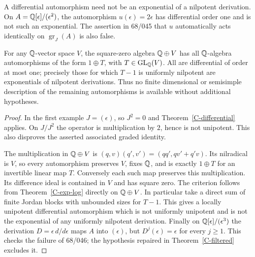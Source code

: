 \begin{proposition}\label{C-other-autos}
A differential automorphism need not be an exponential of a nilpotent
derivation. On $A={\mathbb{Q}}[\epsilon]/(\epsilon^2)$, the automorphism
$u(\epsilon)=2\epsilon$ has differential order one and is not such an
exponential. The assertion in 68/045 that $u$ automatically acts identically
on $\operatorname{gr}_J(A)$ is also false.

For any ${\mathbb{Q}}$-vector space $V$, the square-zero algebra ${\mathbb{Q}}\oplus V$ has
all ${\mathbb{Q}}$-algebra automorphisms of the form $1\oplus T$, with
$T\in\operatorname{GL}_{{\mathbb{Q}}}(V)$. All are differential of order at most one;
precisely those for which $T-1$ is uniformly nilpotent are exponentials of
nilpotent derivations. Thus no finite dimensional or semisimple description
of the remaining automorphisms is available without additional hypotheses.
\end{proposition}
\begin{proof}
In the first example $J=(\epsilon)$, so $J^2=0$ and
Theorem~\ref{C-differential} applies. On $J/J^2$ the operator is
multiplication by $2$, hence is not unipotent. This also disproves the
asserted associated graded identity.

The multiplication in ${\mathbb{Q}}\oplus V$ is
$(q,v)(q',v')=(qq',qv'+q'v)$. Its nilradical is $V$, so every automorphism
preserves $V$, fixes ${\mathbb{Q}}$, and is exactly $1\oplus T$ for an invertible
linear map $T$. Conversely each such map preserves this multiplication.
Its difference ideal is contained in $V$ and has square zero.
The criterion follows from Theorem~\ref{C-exp-log} directly on
${\mathbb{Q}}\oplus V$. In particular take a direct sum of finite Jordan blocks
with unbounded sizes for $T-1$. This gives a locally unipotent differential
automorphism which is not uniformly unipotent and is not the exponential
of any uniformly nilpotent derivation. Finally on
${\mathbb{Q}}[\epsilon]/(\epsilon^3)$ the derivation
$D=\epsilon\,d/d\epsilon$ maps $A$ into $(\epsilon)$, but
$D^j(\epsilon)=\epsilon$ for every $j\geq1$. This checks the failure of
68/046; the hypothesis repaired in Theorem~\ref{C-filtered} excludes it.
\end{proof}

